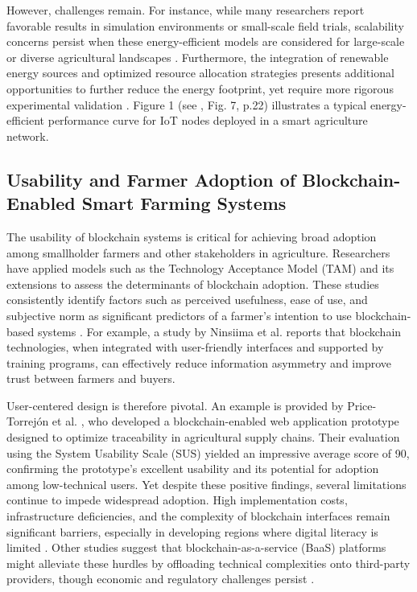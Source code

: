 \documentclass[12pt,onecolumn]{IEEEtran} %
\begin{document}
However, challenges remain. For instance, while many researchers report favorable results in simulation environments or small-scale field trials, scalability concerns persist when these energy-efficient models are considered for large-scale or diverse agricultural landscapes \cite{akella2023asystematicreview, munaganuri2025designofan}. Furthermore, the integration of renewable energy sources and optimized resource allocation strategies presents additional opportunities to further reduce the energy footprint, yet require more rigorous experimental validation \cite{tahayur2024enhancingelectronicagriculture, mwewa2024blockchaintechnologya}. Figure 1 (see \cite{munaganuri2025designofan}, Fig. 7, p.22) illustrates a typical energy-efficient performance curve for IoT nodes deployed in a smart agriculture network.

\subsection{Usability and Farmer Adoption of Blockchain-Enabled Smart Farming Systems}
The usability of blockchain systems is critical for achieving broad adoption among smallholder farmers and other stakeholders in agriculture. Researchers have applied models such as the Technology Acceptance Model (TAM) and its extensions \cite{ninsiima2025determinantsofsmallholder, mwewa2024blockchaintechnologya} to assess the determinants of blockchain adoption. These studies consistently identify factors such as perceived usefulness, ease of use, and subjective norm as significant predictors of a farmer’s intention to use blockchain-based systems \cite{ninsiima2025determinantsofsmallholder, mwewa2024blockchaintechnologya}. For example, a study by Ninsiima et al. \cite{ninsiima2025determinantsofsmallholder} reports that blockchain technologies, when integrated with user-friendly interfaces and supported by training programs, can effectively reduce information asymmetry and improve trust between farmers and buyers.

User-centered design is therefore pivotal. An example is provided by Price-Torrejón et al. \cite{pricetorrejon2025designofa}, who developed a blockchain-enabled web application prototype designed to optimize traceability in agricultural supply chains. Their evaluation using the System Usability Scale (SUS) yielded an impressive average score of 90, confirming the prototype’s excellent usability and its potential for adoption among low-technical users. Yet despite these positive findings, several limitations continue to impede widespread adoption. High implementation costs, infrastructure deficiencies, and the complexity of blockchain interfaces remain significant barriers, especially in developing regions where digital literacy is limited \cite{ninsiima2025determinantsofsmallholder, akella2023asystematicreview}. Other studies suggest that blockchain-as-a-service (BaaS) platforms might alleviate these hurdles by offloading technical complexities onto third-party providers, though economic and regulatory challenges persist \cite{akella2023asystematicreview}.
\end{document}

